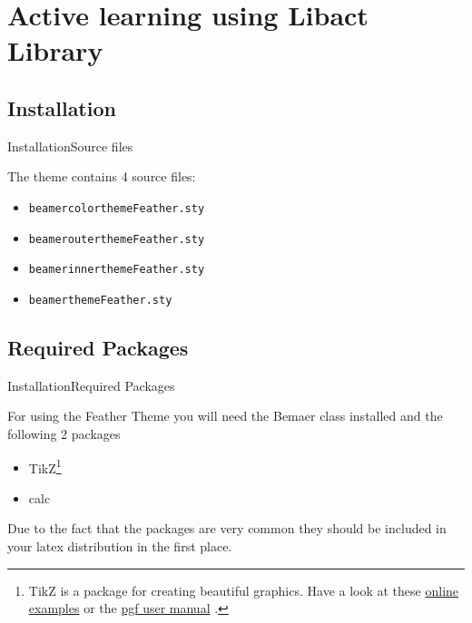 \documentclass[10pt]{beamer}
\newcommand{\chref}[2]{
  \href{#1}{{\usebeamercolor[bg]{Feather}#2}}
}
\begin{document}
\section{Active learning using Libact Library}
\subsection{Installation}
\begin{frame}{Installation}{Source files}

\begin{block}{}
The theme contains 4 source files:
  \begin{itemize}
    \item {\tt beamercolorthemeFeather.sty}
    \item {\tt beamerouterthemeFeather.sty}
    \item {\tt beamerinnerthemeFeather.sty}
    \item {\tt beamerthemeFeather.sty}
  \end{itemize}
\end{block}
\end{frame}

\subsection{Required Packages}
\begin{frame}{Installation}{Required Packages}

  For using the Feather Theme you will need the Bemaer class installed and the following 2 packages
  \begin{itemize}
    \item TikZ\footnote{TikZ is a package for creating beautiful graphics. Have a look at these \chref{http://www.texample.net/tikz/examples/}{online examples} or the \chref{http://tug.ctan.org/tex-archive/graphics/pgf/base/doc/generic/pgf/pgfmanual.pdf}{pgf user manual}.}
    \item calc
  \end{itemize}
  Due to the fact that the packages are very common they should be included in your latex distribution in the first place.
\end{frame}

\end{document}
